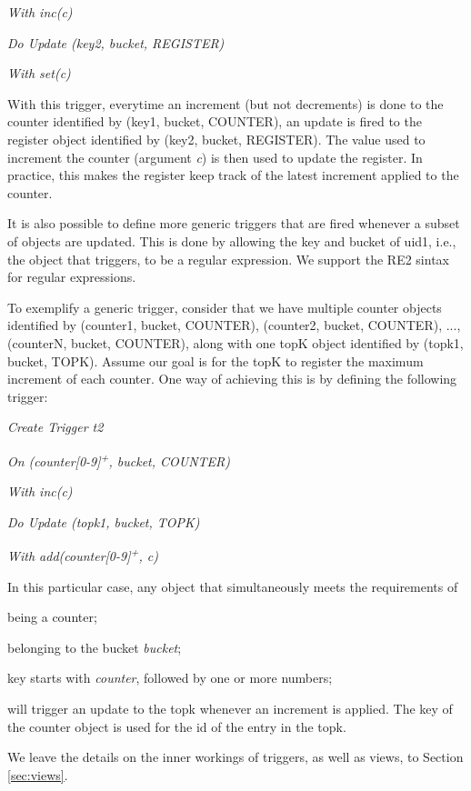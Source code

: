 \documentclass{vldb}
\newcommand{\emphvspace}{0.5\baselineskip}
\newcommand{\firstblockemph}[1]{\vspace{\emphvspace}\hspace{2em}\emph{#1}}
\newcommand{\middleblockemph}[1]{\hspace{2em}\emph{#1}}
\newcommand{\lastblockemph}[1]{\hspace{2em}\emph{#1}\vspace{\emphvspace}}
\begin{document}
\middleblockemph{With inc(c)}

\middleblockemph{Do Update (key2, bucket, REGISTER)}

\lastblockemph{With set(c)}

With this trigger, everytime an increment (but not decrements) is done to the counter identified by (key1, bucket, COUNTER), an update is fired to the register object identified by (key2, bucket, REGISTER).
The value used to increment the counter (argument \emph{c}) is then used to update the register.
In practice, this makes the register keep track of the latest increment applied to the counter.

It is also possible to define more generic triggers that are fired whenever a subset of objects are updated.
This is done by allowing the key and bucket of uid1, i.e., the object that triggers, to be a regular expression.
We support the RE2 \cite{RE2sintax} sintax for regular expressions.

To exemplify a generic trigger, consider that we have multiple counter objects identified by (counter1, bucket, COUNTER), (counter2, bucket, COUNTER), ..., (counterN, bucket, COUNTER), along with one topK object identified by (topk1, bucket, TOPK).
Assume our goal is for the topK to register the maximum increment of each counter.
One way of achieving this is by defining the following trigger:

\firstblockemph{Create Trigger t2}

\middleblockemph{On (counter[0-9]\textsuperscript{+}, bucket, COUNTER)}

\middleblockemph{With inc(c)}

\middleblockemph{Do Update (topk1, bucket, TOPK)}

\lastblockemph{With add(counter[0-9]\textsuperscript{+}, c)}

In this particular case, any object that simultaneously meets the requirements of
\begin{enumerate*}[label=(\roman*)] 
	\item being a counter; 
	\item belonging to the bucket \emph{bucket};
	\item key starts with \emph{counter}, followed by one or more numbers;
\end{enumerate*}
will trigger an update to the topk whenever an increment is applied.
The key of the counter object is used for the id of the entry in the topk.

We leave the details on the inner workings of triggers, as well as views, to Section \ref{sec:views}.
\end{document}
